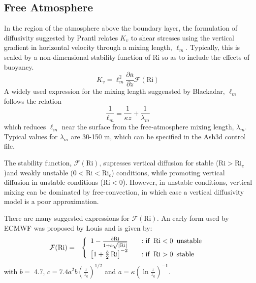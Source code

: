 \subsection{Free Atmosphere}
In the region of the atmosphere above the boundary layer, the formulation of diffusivity
suggested by Prantl relates $K_v$ to shear stresses using the vertical gradient in
horizontal velocity through a mixing length, $\ell_m$. %
Typically, this is scaled by a non-dimensional stability function of $\mathrm{Ri}$ so as to
include the effects of buoyancy.
\begin{equation}\label{VarDiff_Eq_Kz_FreAtmos}
K_v = \ell_m^2 \frac{\partial \overline{u}}{\partial z}  \mathcal{F}(\mathrm{Ri})
\end{equation}
A widely used expression for the mixing length suggensted by Blackadar, $\ell_m$ follows the relation
\begin{equation}\label{VarDiff_Eq_MixLen}
\frac{1}{\ell_m} = \frac{1}{\kappa z} + \frac{1}{\lambda_m}
\end{equation}
which reduces $\ell_m$ near the surface from the free-atmosphere mixing length, $\lambda_m$. Typical
values for $\lambda_m$ are 30-150 $\mathrm{m}$, which can be specified in the Ash3d control file.

The stability function, $\mathcal{F}(\mathrm{Ri})$, supresses vertical diffusion for stable
($\mathrm{Ri}>\mathrm{Ri}_c$)and weakly unstable ($0<\mathrm{Ri} < \mathrm{Ri}_c$) conditions,
while promoting vertical diffusion in unstable conditions ($\mathrm{Ri}<0$).
However, in unstable conditions, vertical mixing
can be dominated by free-convection, in which case a vertical diffusivity model is a poor approximation.


There are many suggested expressions for $\mathcal{F}(\mathrm{Ri})$. An early form used by ECMWF was proposed
by Louis \cite{Louis1979} and is given by:
\begin{eqnarray}\label{VarDiff_Eq_F_Louis}
\mathcal{F}(\mathrm{Ri}) &=& \left\{ \begin{array} {l@{\quad \quad}l}
 1 - \frac{b \mathrm{Ri}}{1+c \sqrt{\left| \mathrm{Ri}\right|}}  &: \mathrm{if}\,\,\, \mathrm{Ri} < 0 \,\,\, \mathrm{unstable} \\
 \left[ 1+ \frac{b}{2} \, \mathrm{Ri} \right]^{-2}               &: \mathrm{if}\,\,\, \mathrm{Ri} > 0 \,\,\, \mathrm{stable}
\end{array}
\right.
\end{eqnarray}
with $b =$ 4.7, $c=7.4 a^2b \left( \frac{z}{z_0} \right)^{1/2}$ and $a=\kappa \left(\ln{\frac{z}{z_0}} \right)^{-1}$.

